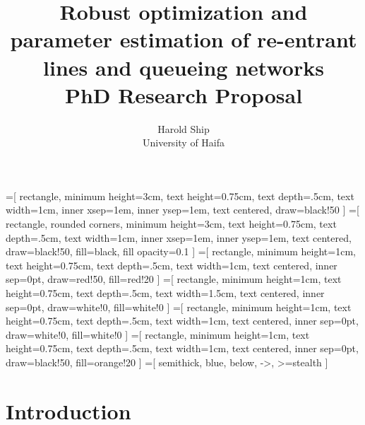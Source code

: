\documentclass[11pt,a4paper,titlepage]{article}
\title{Robust optimization and parameter estimation of re-entrant lines and
    queueing networks \\ PhD Research Proposal}
\author{Harold Ship \\ University of Haifa}
\theoremstyle{definition}
\begin{document}
=[%
rectangle,
minimum height=3cm,
text height=0.75cm,
text depth=.5cm,
text width=1cm,
inner xsep=1em,
inner ysep=1em,
text centered,
draw=black!50
]
=[%
rectangle,
rounded corners,
minimum height=3cm,
text height=0.75cm,
text depth=.5cm,
text width=1cm,
inner xsep=1em,
inner ysep=1em,
text centered,
draw=black!50,
fill=black,
fill opacity=0.1
]
=[%
rectangle,
minimum height=1cm,
text height=0.75cm,
text depth=.5cm,
text width=1cm,
text centered,
inner sep=0pt,
draw=red!50,
fill=red!20
]
=[%
rectangle,
minimum height=1cm,
text height=0.75cm,
text depth=.5cm,
text width=1.5cm,
text centered,
inner sep=0pt,
draw=white!0,
fill=white!0
]
=[%
rectangle,
minimum height=1cm,
text height=0.75cm,
text depth=.5cm,
text width=1cm,
text centered,
inner sep=0pt,
draw=white!0,
fill=white!0
]
=[%
rectangle,
minimum height=1cm,
text height=0.75cm,
text depth=.5cm,
text width=1cm,
text centered,
inner sep=0pt,
draw=black!50,
fill=orange!20
]
=[%
semithick,
blue,
below,
->,
>=stealth
]



\maketitle \clearpage
\tableofcontents \clearpage
\iffalse %
\listoffigures \clearpage
\fi
\iffalse %
\listoftables \clearpage
\fi
\printglossaries \clearpage


\setcounter{page}{1}


\section{Introduction}
\label{sec:introduction}
\end{document}
